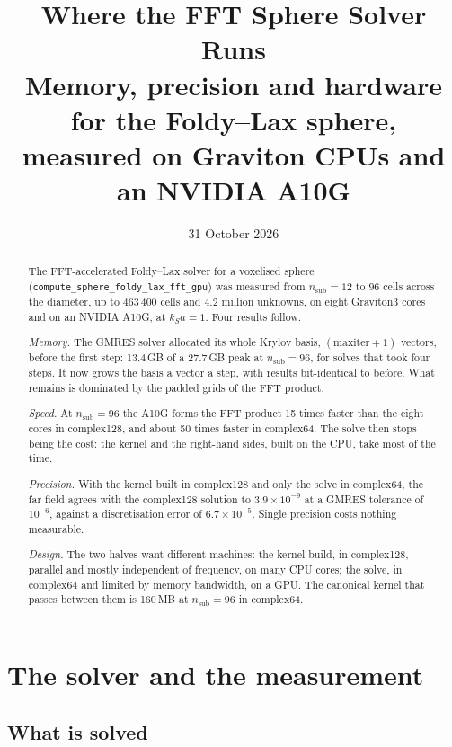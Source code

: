\documentclass[11pt,a4paper]{article}
\title{\bfseries Where the FFT Sphere Solver Runs\\[4pt]
\large Memory, precision and hardware for the Foldy--Lax sphere,\\
measured on Graviton CPUs and an NVIDIA A10G}
\author{}
\date{31 October 2026}
\newcommand{\nsub}{n_{\mathrm{sub}}}
\newcommand{\code}[1]{\nolinkurl{#1}}
\begin{document}
\maketitle

\begin{abstract}
\noindent
The FFT-accelerated Foldy--Lax solver for a voxelised sphere
(\code{compute_sphere_foldy_lax_fft_gpu}) was measured from $\nsub = 12$ to $96$ cells across the diameter,
up to 463\,400 cells and 4.2 million unknowns, on eight Graviton3 cores and on an NVIDIA A10G, at $k_S a = 1$. Four
results follow.

\emph{Memory.} The GMRES solver allocated its whole Krylov basis, $(\mathrm{maxiter}+1)$ vectors, before the first
step: 13.4\,GB of a 27.7\,GB peak at $\nsub = 96$, for solves that took four steps. It now grows the basis a vector
a step, with results bit-identical to before. What remains is dominated by the padded grids of the FFT product.

\emph{Speed.} At $\nsub = 96$ the A10G forms the FFT product 15 times faster than the eight cores in complex128, and
about 50 times faster in complex64. The solve then stops being the cost: the kernel and the right-hand sides, built on
the CPU, take most of the time.

\emph{Precision.} With the kernel built in complex128 and only the solve in complex64, the far field agrees with the
complex128 solution to $3.9\times10^{-9}$ at a GMRES tolerance of $10^{-6}$, against a discretisation error of
$6.7\times10^{-5}$. Single precision costs nothing measurable.

\emph{Design.} The two halves want different machines: the kernel build, in complex128, parallel and mostly
independent of frequency, on many CPU cores; the solve, in complex64 and limited by memory bandwidth, on a GPU. The
canonical kernel that passes between them is 160\,MB at $\nsub = 96$ in complex64.
\end{abstract}

\tableofcontents

\section{The solver and the measurement}\label{sec:setup}

\subsection{What is solved}
\end{document}
